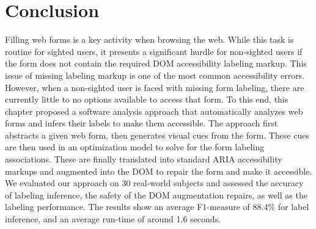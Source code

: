 \section{Conclusion}

Filling web forms is a key activity when browsing the web. 
While this task is routine for sighted users, 
it presents a significant hurdle for non-sighted users if the form does not 
contain the required DOM accessibility labeling markup. This 
issue of missing labeling markup is one of the most common accessibility 
errors. However, 
when a non-sighted user is faced with missing form labeling, 
there are currently little to no options available to access 
that form. To this end, this chapter proposed a software analysis approach 
that automatically analyzes web forms and infers their labels to make them accessible. 
The approach first abstracts a given web form, then generates 
visual cues from the form. These cues are then used in an optimization 
model to solve for the form labeling associations. These are 
finally translated into standard ARIA accessibility markups and augmented into 
the DOM to repair the form and make it accessible. 
We evaluated our approach on 30 real-world subjects 
and assessed the accuracy of labeling inference, the safety of 
the DOM augmentation repairs, as well as the labeling performance. 
The results show an average F1-measure of 88.4\% for label 
inference, and an average run-time of around 1.6 seconds.
